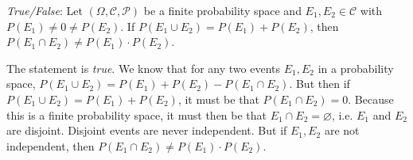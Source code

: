 \documentclass[11pt,letterpaper]{article}
\begin{document}
\quizsol \textit{True/False}: Let $(\Omega, \mathcal{C}, \mathcal{P})$ be a finite probability space and $E_1, E_2 \in \mathcal{C}$ with $P(E_1) \neq 0 \neq P(E_2)$. If $P(E_1 \cup E_2)= P(E_1) + P(E_2)$, then $P(E_1 \cap E_2) \neq P(E_1) \cdot P(E_2)$. \pspace

\sol The statement is \textit{true}. We know that for any two events $E_1, E_2$ in a probability space, $P(E_1 \cup E_2)= P(E_1) + P(E_2) - P(E_1 \cap E_2)$. But then if $P(E_1 \cup E_2)= P(E_1) + P(E_2)$, it must be that $P(E_1 \cap E_2)= 0$. Because this is a finite probability space, it must then be that $E_1 \cap E_2= \varnothing$, i.e. $E_1$ and $E_2$ are disjoint. Disjoint events are never independent. But if $E_1, E_2$ are not independent, then $P(E_1 \cap E_2) \neq P(E_1) \cdot P(E_2)$. 
\end{document}
